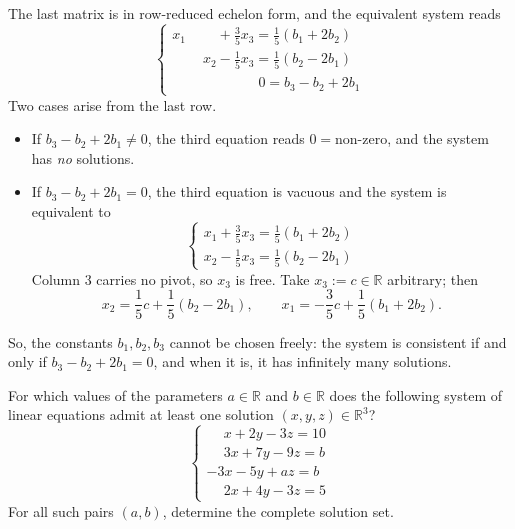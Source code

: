 \begin{example}
\[\]
The last matrix is in row-reduced echelon form, and the equivalent system reads
\[
\begin{cases}
x_1 \phantom{{}+ x_2} + \frac{3}{5}x_3 = \frac{1}{5}(b_1 + 2b_2) \\
\phantom{x_1 + {}} x_2 - \frac{1}{5}x_3 = \frac{1}{5}(b_2 - 2b_1) \\
\phantom{x_1 + x_2 + \frac{3}{5}x_3 \; } 0 = b_3 - b_2 + 2b_1
\end{cases}
\]
Two cases arise from the last row.
\begin{itemize}
    \item If $b_3 - b_2 + 2b_1 \ne 0$, the third equation reads $0 = \text{non-zero}$, and the system has \emph{no} solutions.
    \item If $b_3 - b_2 + 2b_1 = 0$, the third equation is vacuous and the system is equivalent to
    \[
    \begin{cases}
    x_1 + \frac{3}{5}x_3 = \frac{1}{5}(b_1 + 2b_2) \\
    x_2 - \frac{1}{5}x_3 = \frac{1}{5}(b_2 - 2b_1)
    \end{cases}
    \]
    Column $3$ carries no pivot, so $x_3$ is free. Take $x_3 := c \in \mathbb{R}$ arbitrary; then
    \[
    x_2 = \frac{1}{5}c + \frac{1}{5}(b_2 - 2b_1), \qquad
    x_1 = -\frac{3}{5}c + \frac{1}{5}(b_1 + 2b_2).
    \]
\end{itemize}
So, the constants $b_1, b_2, b_3$ cannot be chosen freely: the system is consistent if and only if $b_3 - b_2 + 2b_1 = 0$, and when it is, it has infinitely many solutions.
\end{example}

\begin{exercise}
\label{exc:two_parameter_linear_system}
For which values of the parameters $a \in \mathbb{R}$ and $b \in \mathbb{R}$ does the following system of linear equations admit at least one solution $(x, y, z) \in \mathbb{R}^3$?
\[
\begin{cases}
\phantom{-}x + 2y - 3z = 10 \\
\phantom{-}3x + 7y - 9z = b \\
-3x - 5y + az = b \\
\phantom{-}2x + 4y - 3z = 5
\end{cases}
\]
For all such pairs $(a, b)$, determine the complete solution set.
\end{exercise}


